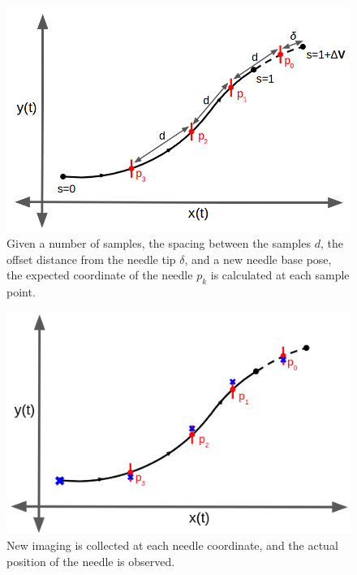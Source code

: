 \begin{figure}[h]
\includegraphics[width=1.0\textwidth]{Fig/chap3/curvefit_pt1.png}
\caption{Given a number of samples, the spacing between the samples $d$, the offset distance from the needle tip $\delta$, and a new needle base pose, the expected coordinate of the needle $p_k$ is calculated at each sample point.}
\label{fig:curve_fit_pt1}
\end{figure}

\begin{figure}[h]
\includegraphics[width=1.0\textwidth]{Fig/chap3/curvefit_pt2.png}
\caption{New imaging is collected at each needle coordinate, and the actual position of the needle is observed.}
\label{fig:curve_fit_pt2}
\end{figure}

